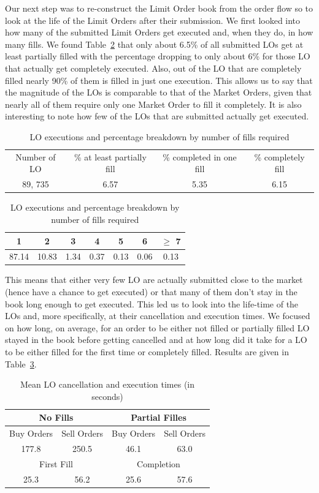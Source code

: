 Our next step was to re-construct the Limit Order book from the order flow so to look at the life of the Limit Orders after their submission. We first looked into how many of the submitted Limit Orders get executed and, when they do, in how many fills. We found Table~\ref{tab:LOexec} that only about 6.5\% of all submitted LOs get at least partially filled with the percentage dropping to only about 6\% for those LO that actually get completely executed. Also, out of the LO that are completely filled nearly 90\% of them is filled in just one execution. This allows us to say that the magnitude of the LOs is comparable to that of the Market Orders, given that nearly all of them require only one Market Order to fill it completely. It is also interesting to note how few of the LOs that are submitted actually get executed. 
	\begin{table}
	\centering
	\caption{LO executions and percentage breakdown by number of fills required \label{tab:LOexec}}
	\begin{tabular}{cccc}
	Number of LO & \% at least partially fill & \% completed in one fill & \% completely fill \\
	89, 735 & 6.57 & 5.35 & 6.15
	\end{tabular}
	\begin{tabular}{ccccccc}
	1 & 2 & 3 & 4 & 5 & 6 & $\geq$ 7 \\ \hline
	87.14 & 10.83 & 1.34 & 0.37 & 0.13 & 0.06 & 0.13
	\end{tabular}
	\end{table}


This means that either very few LO are actually submitted close to the market (hence have a chance to get executed) or that many of them don't stay in the book long enough to get executed. This led us to look into the life-time of the LOs and, more specifically, at their cancellation and execution times. We focused on how long, on average, for an order to be either not filled or partially filled LO stayed in the book before getting cancelled and at how long did it take for a LO to be either filled for the first time or completely filled. Results are given in Table~\ref{tab:meanlo}.
	\begin{table}
	\centering
	\caption{Mean LO cancellation and execution times (in seconds) \label{tab:meanlo}}
	\begin{tabular}{cccc}
	\multicolumn{2}{c}{No Fills} & \multicolumn{2}{c}{Partial Filles} \\ \hline
	Buy Orders & Sell Orders & Buy Orders & Sell Orders \\ \hline
	177.8 & 250.5 & 46.1 & 63.0 \\ \hline
	\multicolumn{2}{c}{First Fill} & \multicolumn{2}{c}{Completion} \\ \hline
	 25.3 & 56.2 & 25.6 & 57.6
	\end{tabular}
	\end{table}

